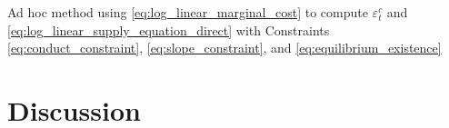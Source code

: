 \documentclass[11pt, a4paper]{article}
\theoremstyle{remark}
\begin{document}
\begin{table}[!htbp]
  \begin{center}
  \caption{Ad hoc method using \eqref{eq:log_linear_marginal_cost} to compute $\varepsilon_t^c$ and \eqref{eq:log_linear_supply_equation_direct} with Constraints \eqref{eq:conduct_constraint}, \eqref{eq:slope_constraint}, and \eqref{eq:equilibrium_existence}}
  \label{tb:loglinear_loglinear_sigma_1_mpec_theta_constraint_slope_constraint_bias_rmse} 
  \begin{adjustbox}{width=\textwidth}
    
  \end{adjustbox}
  \end{center}
\end{table}



\section{Discussion}
\end{document}
